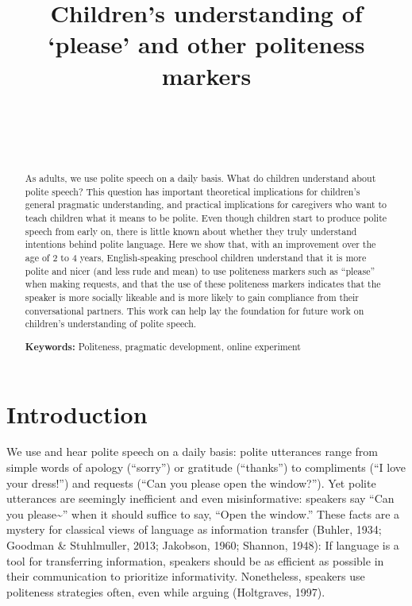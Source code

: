 \documentclass[10pt, letterpaper]{article}
\title{Children's understanding of `please' and other politeness markers}
\author{{\large \bf } \\ \texttt{} \\  \\}
\begin{document}
\maketitle

\begin{abstract}
As adults, we use polite speech on a daily basis. What do children
understand about polite speech? This question has important theoretical
implications for children's general pragmatic understanding, and
practical implications for caregivers who want to teach children what it
means to be polite. Even though children start to produce polite speech
from early on, there is little known about whether they truly understand
intentions behind polite language. Here we show that, with an
improvement over the age of 2 to 4 years, English-speaking preschool
children understand that it is more polite and nicer (and less rude and
mean) to use politeness markers such as ``please'' when making requests,
and that the use of these politeness markers indicates that the speaker
is more socially likeable and is more likely to gain compliance from
their conversational partners. This work can help lay the foundation for
future work on children's understanding of polite speech.

\textbf{Keywords:}
Politeness, pragmatic development, online experiment
\end{abstract}

\section{Introduction}\label{introduction}

We use and hear polite speech on a daily basis: polite utterances range
from simple words of apology (``sorry'') or gratitude (``thanks'') to
compliments (``I love your dress!'') and requests (``Can you please open
the window?''). Yet polite utterances are seemingly inefficient and even
misinformative: speakers say ``Can you please\textasciitilde{}'' when it
should suffice to say, ``Open the window.'' These facts are a mystery
for classical views of language as information transfer (Buhler, 1934;
Goodman \& Stuhlmuller, 2013; Jakobson, 1960; Shannon, 1948): If
language is a tool for transferring information, speakers should be as
efficient as possible in their communication to prioritize
informativity. Nonetheless, speakers use politeness strategies often,
even while arguing (Holtgraves, 1997).
\end{document}
